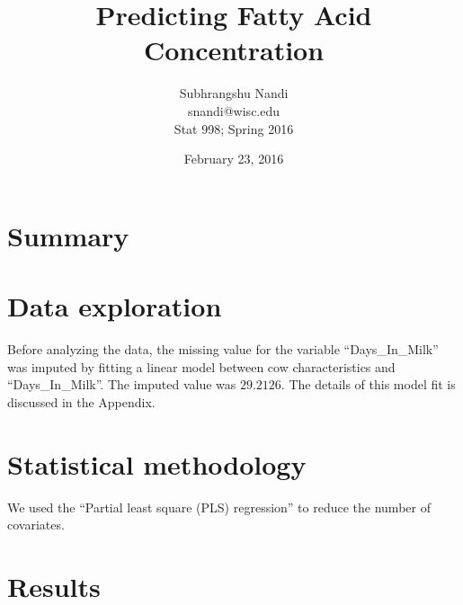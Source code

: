\documentclass[12pt]{article}
\begin{document}
\title{Predicting Fatty Acid Concentration}

\author{Subhrangshu Nandi \\
	snandi@wisc.edu \\	
	Stat 998; Spring 2016}
\date{February 23, 2016}

\maketitle



\section*{Summary}\label{Sec_Summary}

\section*{Data exploration} \label{Sec_Data}
Before analyzing the data, the missing value for the variable ``Days\_In\_Milk'' was imputed by fitting a linear model between cow characteristics and ``Days\_In\_Milk''. The imputed value was $29.2126$. The details of this model fit is discussed in the Appendix. 

\section*{Statistical methodology} \label{Sec_Methods}
We used the ``Partial least square (PLS) regression'' \cite{Mevik_Wehrens_2007_JSS} to reduce the number of covariates. 

\section*{Results} \label{Sec_Results}

\end{document}
